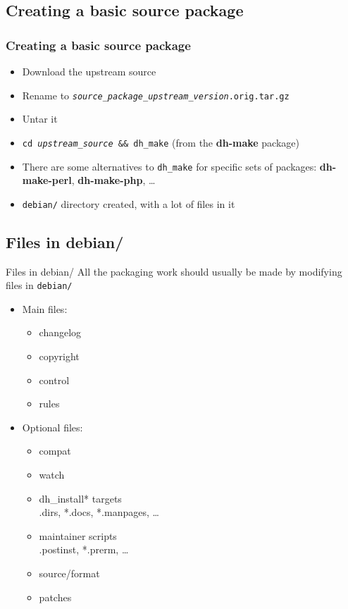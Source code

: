 \documentclass[10pt,final]{beamer}
\begin{document}
\subsection{Creating a basic source package}
\begin{frame}
\frametitle{Creating a basic source package}
\begin{itemize}
	\item Download the upstream source
		\hbr
	\item Rename to \texttt{\textsl{source\_package}\_\textsl{upstream\_version}.orig.tar.gz}
		\hbr
	\item Untar it
		\hbr
	\item \texttt{cd \textsl{upstream\_source} \&\& dh\_make} (from the \textbf{dh-make} package)
		\hbr
	\item There are some alternatives to \texttt{dh\_make} for specific sets of packages: \textbf{dh-make-perl}, \textbf{dh-make-php}, \ldots
		\hbr
	\item \texttt{debian/} directory created, with a lot of files in it
\end{itemize}
\end{frame}

\subsection{Files in debian/}
\begin{frame}{Files in debian/}
	All the packaging work should usually be made by modifying files in \texttt{debian/}
\hbr
\begin{itemize}
	\item Main files:
	\begin{itemize}
		\item changelog
		\item copyright
		\item control
		\item rules
	\end{itemize}
	\hbr
	\item Optional files:
	\begin{itemize}
		\item compat
		\item watch
		\item dh\_install* targets\\
			{\small *.dirs, *.docs, *.manpages, \ldots}
		\item maintainer scripts\\
			{\small *.postinst, *.prerm, \ldots}
		\item source/format
		\item patches
	\end{itemize}
\end{itemize}
\end{frame}
\end{document}
